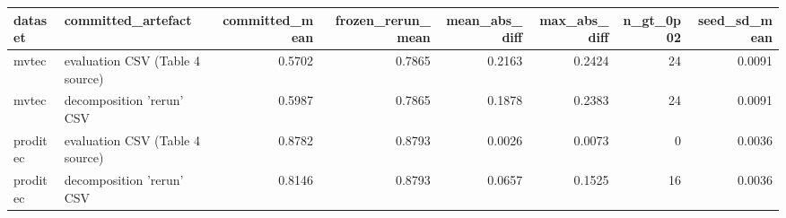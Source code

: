 \begin{tabular}{llrrrrrr}
\toprule
 dataset &              committed\_artefact &  committed\_mean &  frozen\_rerun\_mean &  mean\_abs\_diff &  max\_abs\_diff &  n\_gt\_0p02 &  seed\_sd\_mean \\
\midrule
   mvtec & evaluation CSV (Table 4 source) &          0.5702 &             0.7865 &         0.2163 &        0.2424 &         24 &        0.0091 \\
   mvtec &       decomposition 'rerun' CSV &          0.5987 &             0.7865 &         0.1878 &        0.2383 &         24 &        0.0091 \\
proditec & evaluation CSV (Table 4 source) &          0.8782 &             0.8793 &         0.0026 &        0.0073 &          0 &        0.0036 \\
proditec &       decomposition 'rerun' CSV &          0.8146 &             0.8793 &         0.0657 &        0.1525 &         16 &        0.0036 \\
\bottomrule
\end{tabular}
